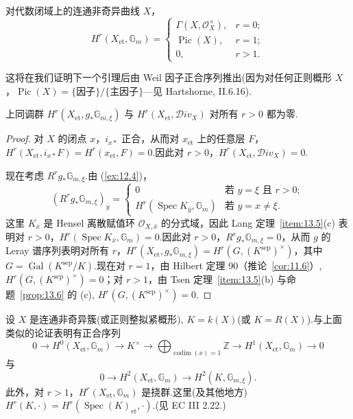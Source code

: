 \begin{theorem}\label{thm:13.7}
对代数闭域上的连通非奇异曲线 $X$，
\[
H^{r}(X_{\mathrm{et}}, \mathbb{G}_{m}) = \begin{cases}
\Gamma(X, \mathcal{O}^{\times}_{X}), & r = 0;\\
\operatorname{Pic}(X), & r = 1;\\
0, & r > 1.
\end{cases}
\]
\end{theorem}

这将在我们证明下一个引理后由 Weil 因子正合序列推出(因为对任何正则概形 $X$，$\operatorname{Pic}(X) = \{$因子$\}/\{$主因子$\}$---见 Hartshorne, II.6.16).

\begin{lemma}\label{lem:13.8}
上同调群 $H^{r}(X_{\mathrm{et}}, g_{*}\mathbb{G}_{m, \xi})$ 与 $H^{r}(X_{\mathrm{et}}, \mathcal{D}iv_X)$ 对所有 $r > 0$ 都为零.
\end{lemma}

\begin{proof}
对 $X$ 的闭点 $x$，$i_{x*}$ 正合，从而对 $x_{\mathrm{et}}$ 上的任意层 $F$，$H^{r}(X_{\mathrm{et}}, i_{x*}F) = H^{r}(x_{\mathrm{et}}, F) = 0$.因此对 $r > 0$，$H^{r}(X_{\mathrm{et}}, \mathcal{D}iv_X) = 0$.

现在考虑 $R^{r}g_{*}\mathbb{G}_{m, \xi}$.由 (\ref{ex:12.4})，
\[
(R^{r}g_{*}\mathbb{G}_{m, \xi})_{\bar{y}} = \begin{cases}
0 & \text{若 } y = \xi \text{ 且 } r > 0;\\
H^{r}(\operatorname{Spec} K_{\bar{y}}, \mathbb{G}_{m}) & \text{若 } y = x \neq \xi.
\end{cases}
\]
这里 $K_{\bar{x}}$ 是 Hensel 离散赋值环 $\mathcal{O}_{X, \bar{x}}$ 的分式域，因此 Lang 定理~\ref{item:13.5}(c) 表明对 $r > 0$，$H^{r}(\operatorname{Spec} K_{\bar{x}}, \mathbb{G}_{m}) = 0$.因此对 $r > 0$，$R^{r}g_{*}\mathbb{G}_{m, \xi} = 0$，从而 $g$ 的 Leray 谱序列表明对所有 $r$，$H^{r}(X_{\mathrm{et}}, g_{*}\mathbb{G}_{m, \xi}) = H^{r}(G, (K^{\mathrm{sep}})^{\times})$，其中 $G = \operatorname{Gal}(K^{\mathrm{sep}}/K)$.现在对 $r = 1$，由 Hilbert 定理 90（推论~\ref{cor:11.6}）, $H^{r}(G, (K^{\mathrm{sep}})^{\times}) = 0$；对 $r > 1$，由 Tsen 定理~\ref{item:13.5}(b) 与命题~\ref{prop:13.6} 的 (c), $H^{r}(G, (K^{\mathrm{sep}})^{\times}) = 0$.
\end{proof}

设 $X$ 是连通非奇异簇(或正则整拟紧概形), $K = k(X)$(或 $K = R(X)$).与上面类似的论证表明有正合序列
\[
0 \to H^{0}(X_{\mathrm{et}}, \mathbb{G}_{m}) \to K^{\times} \to \bigoplus_{\operatorname{codim}(x) = 1} \mathbb{Z} \to H^{1}(X_{\mathrm{et}}, \mathbb{G}_{m}) \to 0
\]
与
\[
0 \to H^{2}(X_{\mathrm{et}}, \mathbb{G}_{m}) \to H^{2}(K, \mathbb{G}_{m, \xi}).
\]
此外，对 $r > 1$，$H^{r}(X_{\mathrm{et}}, \mathbb{G}_{m})$ 是挠群.这里(及其他地方) $H^{r}(K, \cdot) = H^{r}(\operatorname{Spec}(K)_{\mathrm{et}}, \cdot)$.(见 EC III 2.22.)

